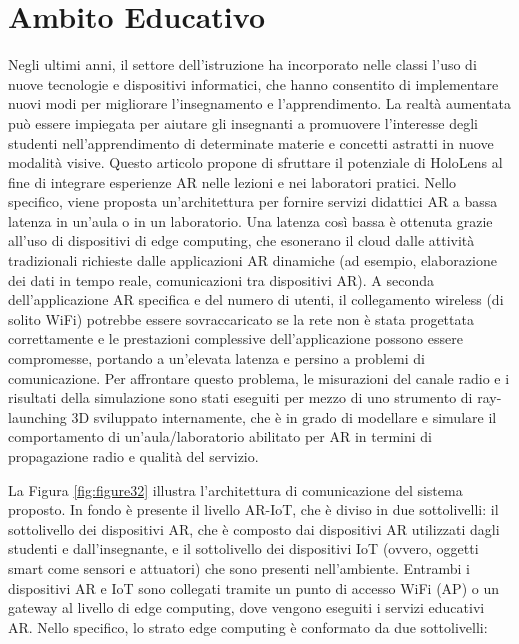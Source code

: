 \section{Ambito Educativo}\label{sec:Sezione3.3}

Negli ultimi anni, il settore dell'istruzione ha incorporato nelle classi l'uso di nuove tecnologie e dispositivi informatici, che hanno consentito di implementare nuovi modi per migliorare l'insegnamento e l'apprendimento. La realtà aumentata può essere impiegata per aiutare gli insegnanti a promuovere l'interesse degli studenti nell'apprendimento di determinate materie e concetti astratti in nuove modalità visive. Questo articolo \cite{Augmented-Reality-Teaching-System} propone di sfruttare il potenziale di HoloLens al fine di integrare esperienze AR nelle lezioni e nei laboratori pratici. Nello specifico, viene proposta un'architettura per fornire servizi didattici AR a bassa latenza in un'aula o in un laboratorio. Una latenza così bassa è ottenuta grazie all'uso di dispositivi di edge computing, che esonerano il cloud dalle attività tradizionali richieste dalle applicazioni AR dinamiche (ad esempio, elaborazione dei dati in tempo reale, comunicazioni tra dispositivi AR). A seconda dell'applicazione AR specifica e del numero di utenti, il collegamento wireless (di solito WiFi) potrebbe essere sovraccaricato se la rete non è stata progettata correttamente e le prestazioni complessive dell'applicazione possono essere compromesse, portando a un'elevata latenza e persino a problemi di comunicazione. Per affrontare questo problema, le misurazioni del canale radio e i risultati della simulazione sono stati eseguiti per mezzo di uno strumento di ray-launching 3D sviluppato internamente, che è in grado di modellare e simulare il comportamento di un'aula/laboratorio abilitato per AR in termini di propagazione radio e qualità del servizio.

La Figura \ref{fig:figure32} illustra l'architettura di comunicazione del sistema proposto. In fondo è presente il livello AR-IoT, che è diviso in due sottolivelli: il sottolivello dei dispositivi AR, che è composto dai dispositivi AR utilizzati dagli studenti e dall'insegnante, e il sottolivello dei dispositivi IoT (ovvero, oggetti smart come sensori e attuatori) che sono presenti nell'ambiente. Entrambi i dispositivi AR e IoT sono collegati tramite un punto di accesso WiFi (AP) o un gateway al livello di edge computing, dove vengono eseguiti i servizi educativi AR. Nello specifico, lo strato edge computing è conformato da due sottolivelli:

